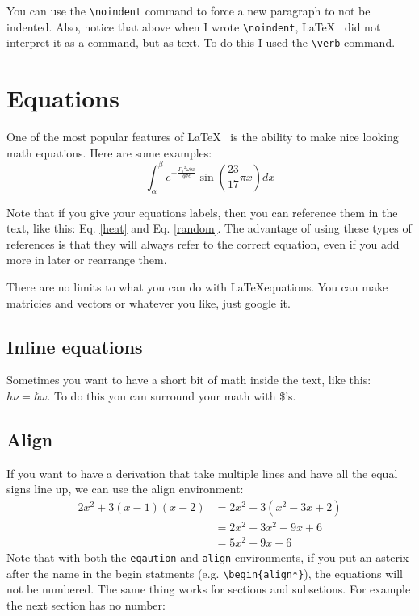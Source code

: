 \documentclass[twocolumn,10 pt,showpacs,preprintnumbers,amsmath,amssymb]{revtex4-1}%
\begin{document}
\noindent You can use the \verb_\noindent_ command to force a new paragraph to
not be indented.  Also, notice that above when I wrote \verb_\noindent_, \LaTeX~
did not interpret it as a command, but as text.  To do this I used the 
\verb_\verb_ command.

\section{Equations}

One of the most popular features of \LaTeX~ is the ability to make nice looking
math equations.  Here are some examples: 
\begin{equation}
  \int_\alpha^\beta e^{-\frac{{\Gamma_0}^2\omega b x}{q \sigma \epsilon}}\sin\left(\frac{23}{17}\pi x\right)dx
  \label{random}
\end{equation}
      
Note that if you give your equations labels, then you can reference them in the
text, like this: Eq. \ref{heat} and Eq. \ref{random}.  The advantage of using
these types of references is that they will always refer to the correct equation,
even if you add more in later or rearrange them.

There are no limits to what you can do with \LaTeX equations. You can make matricies
and vectors or whatever you like, just google it.

\subsection{Inline equations}

Sometimes you want to have a short bit of math inside the text, like this:
$h\nu = \hbar\omega$.  To do this you can surround your math with
\$'s.

\subsection{Align}

If you want to have a derivation that take multiple lines and have all the equal
signs line up, we can use the align environment:
\begin{align}
  2x^2 + 3(x-1)(x-2) &= 2x^2 + 3(x^2-3x+2)\\
  &= 2x^2 + 3x^2 - 9x + 6\\
  &= 5x^2 - 9x + 6
\end{align}
Note that with both the \verb_eqaution_ and \verb_align_ environments, if you 
put an asterix after the name in the begin statments 
(e.g. \verb_\begin{align*}_), the equations will not be numbered.  The 
same thing works for sections and subsetions. For example the next section has
no number:
\end{document}
